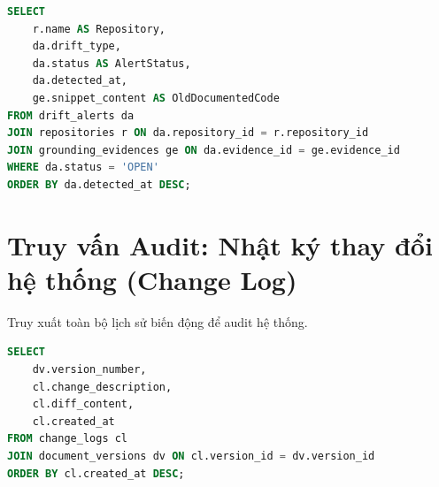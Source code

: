 \begin{lstlisting}[language=SQL]
SELECT 
    r.name AS Repository,
    da.drift_type,
    da.status AS AlertStatus,
    da.detected_at,
    ge.snippet_content AS OldDocumentedCode
FROM drift_alerts da
JOIN repositories r ON da.repository_id = r.repository_id
JOIN grounding_evidences ge ON da.evidence_id = ge.evidence_id
WHERE da.status = 'OPEN'
ORDER BY da.detected_at DESC;
\end{lstlisting}

\section{Truy vấn Audit: Nhật ký thay đổi hệ thống (Change Log)}
Truy xuất toàn bộ lịch sử biến động để audit hệ thống.

\begin{lstlisting}[language=SQL]
SELECT 
    dv.version_number,
    cl.change_description,
    cl.diff_content,
    cl.created_at
FROM change_logs cl
JOIN document_versions dv ON cl.version_id = dv.version_id
ORDER BY cl.created_at DESC;
\end{lstlisting}